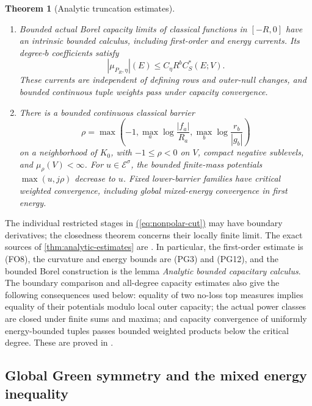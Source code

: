 \documentclass[11pt,reqno]{amsart}
\newtheorem{theorem}{Theorem}[section]
\theoremstyle{definition}
\theoremstyle{remark}
\numberwithin{equation}{section}
\newcommand{\MathEqref}[1]{\begingroup\hypersetup{linkcolor=EquationLink}\hyperref[#1]{(\ref*{#1})}\endgroup}
\begin{document}
\begin{theorem}[Analytic truncation estimates]
\begin{enumerate}
\begin{equation}
\end{equation}
with the corresponding bound for every bounded truncation.
Canonical truncations converge in local coefficient total variation,
including continuous tuple multipliers of growth at most $W^a$.
\item Bounded actual Borel capacity limits of classical functions in
$[-R,0]$ have an intrinsic bounded calculus, including first-order and
energy currents. Its degree-$b$ coefficients satisfy
\begin{equation}\label{eq:bounded-capacity-control}
                |\mu_{P_R,\eta}|(E)\le C_\eta R^bC_S^*(E;V).
\end{equation}
These currents are independent of defining rows and outer-null changes,
and bounded continuous tuple weights pass under capacity convergence.
\item There is a bounded continuous classical barrier
\begin{equation}\label{eq:box-barrier}
 \rho=\max\left(-1,\max_a\log\frac{|f_a|}{R_a},
                      \max_b\log\frac{r_b}{|g_b|}\right)
\end{equation}
on a neighborhood of $K_0$, with $-1\le\rho<0$ on $V$, compact
negative sublevels, and $\mu_\rho(V)<\infty$. For
$u\in\mathcal E^\sigma$, the bounded finite-mass potentials
$\max(u,j\rho)$ decrease to $u$. Fixed lower-barrier families have
critical weighted convergence, including global mixed-energy
convergence in first energy.
\end{enumerate}
\end{theorem}

The individual restricted stages in \MathEqref{eq:nonpolar-cut} may
have boundary derivatives; the closedness theorem concerns their
locally finite limit. The exact sources of
\cref{thm:analytic-estimates} are
\cite[Sections 8, 12, 15--20, 31]{Energy}. In particular, the
first-order estimate is (FO8), the curvature and energy bounds are
(PG3) and (PG12), and the bounded Borel construction is the lemma
\emph{Analytic bounded capacitary calculus}. The boundary comparison
and all-degree capacity estimates also give the following consequences
used below: equality of two no-loss top measures implies equality of
their potentials modulo local outer capacity; the actual power classes
are closed under finite sums and maxima; and capacity convergence of
uniformly energy-bounded tuples passes bounded weighted products below
the critical degree. These are proved in
\cite[Sections 12, 14--18, 28]{Energy}.

\subsection{Global Green symmetry and the mixed energy inequality}
\end{document}
